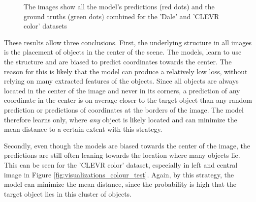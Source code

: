 \begin{figure}[ht]
{        \label{fig:visualizations_colour_complete_train}
    }
    \caption{The images show all the model's predictions (red dots) and the ground truths (green dots) combined for the 'Dale' and 'CLEVR color' datasets}
    \label{fig:visualizations_complete}
\end{figure}

These results allow three conclusions.
First, the underlying structure in all images is the placement of objects in the center of the scene.
The models, learn to use the structure and are biased to predict coordinates towards the center.
The reason for this is likely that the model can produce a relatively low loss, without relying on many extracted features of the objects.
Since all objects are always located in the center of the image and never in its corners, a prediction of any coordinate in the center is on average closer to the target object than any random prediction or predictions of coordinates at the borders of the image.
The model therefore learns only, where \emph{any} object is likely located and can minimize the mean distance to a certain extent with this strategy.

Secondly, even though the models are biased towards the center of the image, the predictions are still often leaning towards the location where many objects lie.
This can be seen for the 'CLEVR color' dataset, especially in left and central image in Figure \ref{fig:visualizations_colour_test}.
Again, by this strategy, the model can minimize the mean distance, since the probability is high that the target object lies in this cluster of objects.


